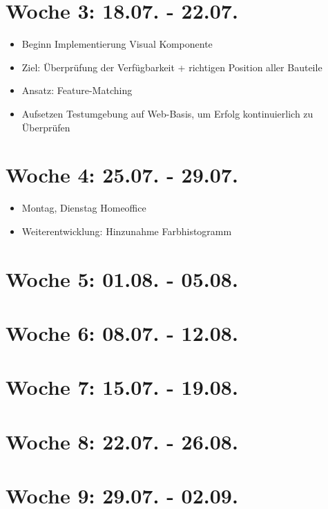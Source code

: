 \section*{Woche 3: 18.07. - 22.07.}
\begin{itemize}
    \item Beginn Implementierung Visual Komponente
    \item Ziel: Überprüfung der Verfügbarkeit + richtigen Position aller Bauteile
    \item Ansatz: Feature-Matching
    \item Aufsetzen Testumgebung auf Web-Basis, um Erfolg kontinuierlich zu Überprüfen
\end{itemize}
\section*{Woche 4: 25.07. - 29.07.}
    \begin{itemize}
        \item {Montag, Dienstag Homeoffice}
        \item Weiterentwicklung: Hinzunahme Farbhistogramm
    \end{itemize}
\section*{Woche 5: 01.08. - 05.08.}
\section*{Woche 6: 08.07. - 12.08.}
\section*{Woche 7: 15.07. - 19.08.}
\section*{Woche 8: 22.07. - 26.08.}
\section*{Woche 9: 29.07. - 02.09.}
